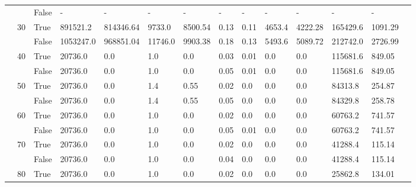 \documentclass{article}
\begin{document}
\begin{landscape}
\begin{small}
\begin{longtable}[c]{@{}lll|ll|ll|ll|ll|lll@{}}
   &    & False & -               & -              & -             & -             & -             & -             & -             & -             & -             & -           &  \\
   & 30 & True  & 891521.2        & 814346.64      & 9733.0        & 8500.54       & 0.13          & 0.11          & 4653.4        & 4222.28       & 165429.6      & 1091.29     &  \\
   &    & False & 1053247.0       & 968851.04      & 11746.0       & 9903.38       & 0.18          & 0.13          & 5493.6        & 5089.72       & 212742.0      & 2726.99     &  \\
   & 40 & True  & 20736.0         & 0.0            & 1.0           & 0.0           & 0.03          & 0.01          & 0.0           & 0.0           & 115681.6      & 849.05      &  \\
   &    & False & 20736.0         & 0.0            & 1.0           & 0.0           & 0.05          & 0.01          & 0.0           & 0.0           & 115681.6      & 849.05      &  \\
   & 50 & True  & 20736.0         & 0.0            & 1.4           & 0.55          & 0.02          & 0.0           & 0.0           & 0.0           & 84313.8       & 254.87      &  \\
   &    & False & 20736.0         & 0.0            & 1.4           & 0.55          & 0.05          & 0.0           & 0.0           & 0.0           & 84329.8       & 258.78      &  \\
   & 60 & True  & 20736.0         & 0.0            & 1.0           & 0.0           & 0.02          & 0.0           & 0.0           & 0.0           & 60763.2       & 741.57      &  \\
   &    & False & 20736.0         & 0.0            & 1.0           & 0.0           & 0.05          & 0.01          & 0.0           & 0.0           & 60763.2       & 741.57      &  \\
   & 70 & True  & 20736.0         & 0.0            & 1.0           & 0.0           & 0.02          & 0.0           & 0.0           & 0.0           & 41288.4       & 115.14      &  \\
   &    & False & 20736.0         & 0.0            & 1.0           & 0.0           & 0.04          & 0.0           & 0.0           & 0.0           & 41288.4       & 115.14      &  \\
   & 80 & True  & 20736.0         & 0.0            & 1.0           & 0.0           & 0.02          & 0.0           & 0.0           & 0.0           & 25862.8       & 134.01      &  \\

\end{longtable}
\end{small}
\end{landscape}
\end{document}
